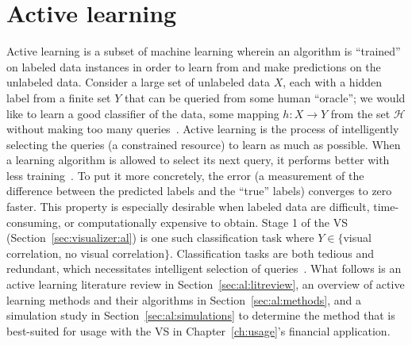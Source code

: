 \chapter{Active learning \label{ch:al}}

Active learning is a subset of machine learning wherein an algorithm is 
``trained'' on labeled data instances in order to learn from and make 
predictions on the unlabeled data.  
Consider a large set of unlabeled data $X$, each with a 
hidden label from a finite set $Y$ that can be queried from some human 
``oracle''; we would like to learn a good classifier of the data, some mapping 
$h: X \rightarrow Y$ from the set $\mathcal{H}$ without making too many 
queries~\cite{dasgupta2011}. Active learning is the process of intelligently 
selecting the queries (a constrained resource) to learn as much as possible. 
When a learning algorithm is allowed to select its next query, it performs 
better with less training~\cite{settles2010}. To put it more concretely, the 
error (a measurement of the difference between the predicted labels and the 
``true'' labels) converges to zero faster. This property is especially 
desirable when labeled data are difficult, time-consuming, or computationally 
expensive to obtain. Stage 1 of the VS (Section~\ref{sec:visualizer:al}) is 
one such classification task where $Y\in\{$visual correlation, no visual 
correlation$\}$. 
Classification tasks are both tedious and redundant, which 
necessitates intelligent selection of queries~\cite{settles2010}. What follows 
is an active learning literature review in Section~\ref{sec:al:litreview}, an 
overview of active learning methods and their algorithms in 
Section~\ref{sec:al:methods}, and a simulation study in 
Section~\ref{sec:al:simulations} to determine the method that is best-suited 
for usage with the VS in Chapter~\ref{ch:usage}'s financial application.





%
%

